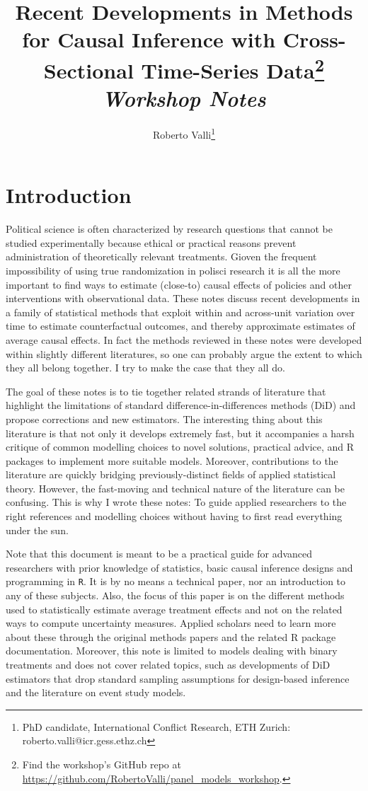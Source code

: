 \documentclass[hidelinks]{article}\usepackage[]{graphicx}\usepackage[]{xcolor}
\author{
	Roberto Valli\thanks{PhD candidate, International Conflict Research, ETH Zurich: roberto.valli@icr.gess.ethz.ch} 
}
\title{
	 Recent Developments in Methods for Causal Inference with Cross-Sectional Time-Series Data\thanks{Find the workshop's GitHub repo at \url{https://github.com/RobertoValli/panel_models_workshop}.}\\[1em]
	 \textit{Workshop Notes}
}
\begin{document}
\maketitle

\section{Introduction}

Political science is often characterized by research questions that cannot be studied experimentally because ethical or practical reasons prevent administration of theoretically relevant treatments. Gioven the frequent impossibility of using true randomization in polisci research it is all the more important to find ways to estimate (close-to) causal effects of policies and other interventions with observational data. These notes discuss recent developments in a family of statistical methods that exploit within and across-unit variation over time to estimate counterfactual outcomes, and thereby approximate estimates of average causal effects. In fact the methods reviewed in these notes were developed within slightly different literatures, so one can probably argue the extent to which they all belong together. I try to make the case that they all do.

The goal of these notes is to tie together related strands of literature that highlight the limitations of standard difference-in-differences methods (DiD) and propose corrections and new estimators. The interesting thing about this literature is that not only it develops extremely fast, but it accompanies a harsh critique of common modelling choices to novel solutions, practical advice, and R packages to implement more suitable models. Moreover, contributions to the literature are quickly bridging previously-distinct fields of applied statistical theory. However, the fast-moving and technical nature of the literature can be confusing. This is why I wrote these notes: To guide applied researchers to the right references and modelling choices without having to first read everything under the sun.

Note that this document is meant to be a practical guide for advanced researchers with prior knowledge of statistics, basic causal inference designs and programming in \texttt{R}. It is by no means a technical paper, nor an introduction to any of these subjects. Also, the focus of this paper is on the different methods used to statistically estimate average treatment effects and not on the related ways to compute uncertainty measures. Applied scholars need to learn more about these through the original methods papers and the related R package documentation. Moreover, this note is limited to models dealing with binary treatments and does not cover related topics, such as developments of DiD estimators that drop standard sampling assumptions for design-based inference and the literature on event study models.
\end{document}
